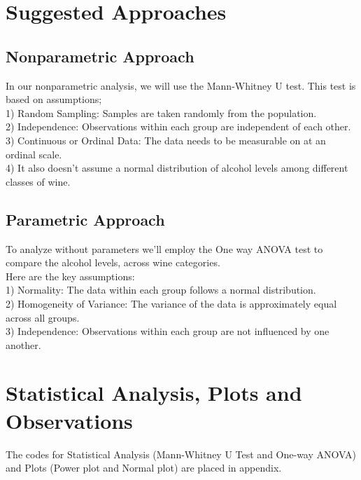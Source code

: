 \documentclass{article}
\begin{document}
\section{Suggested Approaches}
\subsection{Nonparametric Approach}
In our nonparametric analysis, we will use the Mann-Whitney U test. This test is based on assumptions;
\\1) Random Sampling: Samples are taken randomly from the population.
\\2) Independence: Observations within each group are independent of each other.
\\3) Continuous or Ordinal Data: The data needs to be measurable on at an ordinal scale.
\\4) It also doesn't assume a normal distribution of alcohol levels among different classes of wine.

\subsection{Parametric Approach}
To analyze without parameters we'll employ the One way ANOVA test to compare the alcohol levels, across wine categories. 
\\Here are the key assumptions:
\\1) Normality: The data within each group follows a normal distribution.
\\2) Homogeneity of Variance: The variance of the data is approximately equal across all groups.
\\3) Independence: Observations within each group are not influenced by one another.

\section{Statistical Analysis, Plots and Observations}
The codes for Statistical Analysis (Mann-Whitney U Test and One-way ANOVA) and Plots (Power plot and Normal plot) are placed in appendix.

\end{document}
